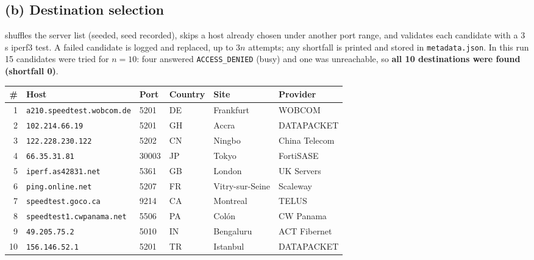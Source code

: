 \documentclass[10pt]{article}
\newcommand{\repo}{https://github.com/philwisniewski/cs-422-assignment-2}
\newcommand{\commit}{d1408ba303b1e3132ba5504e32ebf2ed3572d4e0}
\newcommand{\src}[4]{\href{\repo/blob/\commit/#1\#L#2-L#3}{\texttt{\detokenize{#4}}}}
\begin{document}
\subsection{(b) Destination selection}

\src{run_experiments.py}{106}{153}{select_destinations} shuffles the server list (seeded, seed recorded), skips a host already chosen under another port range, and validates each candidate with a 3\,s iperf3 test. A failed candidate is logged and replaced, up to $3n$ attempts; any shortfall is printed and stored in \texttt{metadata.json}. In this run 15 candidates were tried for $n=10$: four answered \texttt{ACCESS\_DENIED} (busy) and one was unreachable, so \textbf{all 10 destinations were found (shortfall 0)}.

\begin{center}\small
\begin{tabular}{@{}rllll l@{}}
\toprule
\# & Host & Port & Country & Site & Provider \\
\midrule
1 & \texttt{a210.speedtest.wobcom.de} & 5201 & DE & Frankfurt & WOBCOM \\
2 & \texttt{102.214.66.19} & 5201 & GH & Accra & DATAPACKET \\
3 & \texttt{122.228.230.122} & 5202 & CN & Ningbo & China Telecom \\
4 & \texttt{66.35.31.81} & 30003 & JP & Tokyo & FortiSASE \\
5 & \texttt{iperf.as42831.net} & 5361 & GB & London & UK Servers \\
6 & \texttt{ping.online.net} & 5207 & FR & Vitry-sur-Seine & Scaleway \\
7 & \texttt{speedtest.goco.ca} & 9214 & CA & Montreal & TELUS \\
8 & \texttt{speedtest1.cwpanama.net} & 5506 & PA & Colón & CW Panama \\
9 & \texttt{49.205.75.2} & 5010 & IN & Bengaluru & ACT Fibernet \\
10 & \texttt{156.146.52.1} & 5201 & TR & Istanbul & DATAPACKET \\
\bottomrule
\end{tabular}


\end{center}
\end{document}
